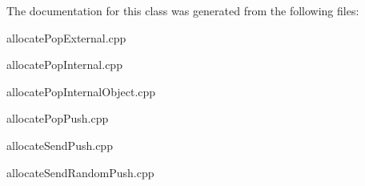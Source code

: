 The documentation for this class was generated from the following files\+:\begin{DoxyCompactItemize}
\item 
allocate\+Pop\+External.\+cpp\item 
allocate\+Pop\+Internal.\+cpp\item 
allocate\+Pop\+Internal\+Object.\+cpp\item 
allocate\+Pop\+Push.\+cpp\item 
allocate\+Send\+Push.\+cpp\item 
allocate\+Send\+Random\+Push.\+cpp\end{DoxyCompactItemize}
